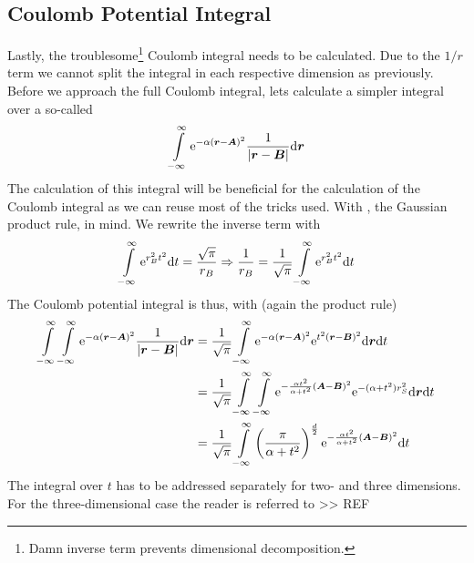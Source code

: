 \subsection{Coulomb Potential Integral}
    Lastly, the troublesome\footnote{Damn inverse term prevents dimensional
    decomposition.} Coulomb integral needs to be calculated. Due to the $1/r$
    term we cannot split the integral in each respective dimension as
    previously. Before we approach the full Coulomb integral, lets calculate a
    simpler integral over a so-called 
        \begin{equation}
            \int\limits^{\infty}_{-\infty} \mathrm{e}^{-\alpha\left(\boldsymbol{{r}} - \boldsymbol{{A}}\right)^2}
            \frac{1}{\abs{\boldsymbol{{r}} - \boldsymbol{{B}}}} \mathrm{d}\boldsymbol{{r}}
        \end{equation}
    The calculation of this integral will be beneficial for the calculation of
    the Coulomb integral as we can reuse most of the tricks used. With
    , the Gaussian product rule, in mind. We
    rewrite the inverse term with
        \begin{equation}
            \int\limits^{\infty}_{-\infty} \mathrm{e}^{r^2_B t^2} \mathrm{d} t = \frac{\sqrt{\pi}}{r_B} \Rightarrow
            \frac{1}{r_B} = \frac{1}{\sqrt{\pi}} \int\limits^{\infty}_{-\infty} \mathrm{e}^{r^2_Bt^2} \mathrm{d} t
            \label{eq:onelectronTrick1}
        \end{equation}
    The Coulomb potential integral is thus, with
    (again the product rule)
        \begin{align}
            \int\limits^{\infty}_{-\infty}\int\limits^{\infty}_{-\infty} \mathrm{e}^{-\alpha\left(\boldsymbol{{r}} - \boldsymbol{{A}}\right)^2}
            \frac{1}{\abs{\boldsymbol{{r}} - \boldsymbol{{B}}}} \mathrm{d}\boldsymbol{{r}} &=
            \frac{1}{\sqrt{\pi}}\int\limits^{\infty}_{-\infty} \mathrm{e}^{-\alpha\left(\boldsymbol{{r}} -
            \boldsymbol{{A}}\right)^2} \mathrm{e}^{t^2(\boldsymbol{{r}} - \boldsymbol{{B}})^2} \mathrm{d}\boldsymbol{{r}} \mathrm{d}
            t \nonumber \\
            &= \frac{1}{\sqrt{\pi}} \int\limits^{\infty}_{-\infty}\int\limits^{\infty}_{-\infty} \mathrm{e}^{-\frac{\alpha
            t^2}{\alpha + t^2}\left(\boldsymbol{{A}} - \boldsymbol{{B}}\right)^2}
            \mathrm{e}^{-(\alpha+t^2)r^2_S} \mathrm{d}\boldsymbol{{r}} \mathrm{d} t \nonumber \\
            &= \frac{1}{\sqrt{\pi}} \int\limits^{\infty}_{-\infty} \left(\frac{\pi}{\alpha +
            t^2}\right)^{\frac{d}{2}} \mathrm{e}^{-\frac{\alpha t^2}{\alpha +
            t^2}\left(\boldsymbol{{A}} - \boldsymbol{{B}}\right)^2} \mathrm{d} t
            \label{eq:coulombPotentialIntegral}
        \end{align}
    The integral over $t$ has to be addressed separately for two- and three
    dimensions. For the three-dimensional case the reader is referred to >> REF
